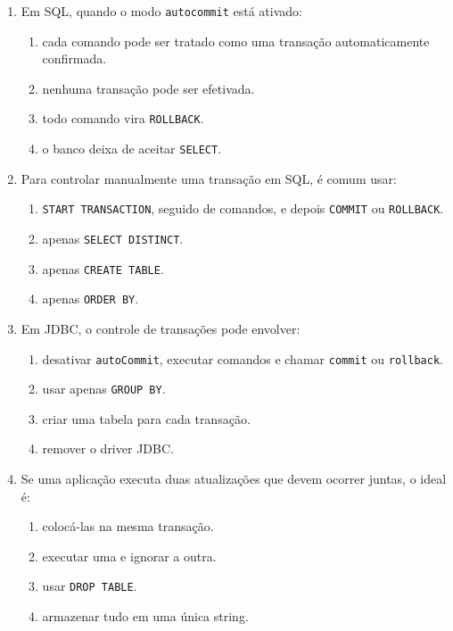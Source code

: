 \documentclass[12pt,a4paper]{article}
\begin{document}
\begin{enumerate}[label=\textbf{Q\arabic*.}]
\item Em SQL, quando o modo \texttt{autocommit} está ativado:

\begin{enumerate}[label=\alph*)]
    \item cada comando pode ser tratado como uma transação automaticamente confirmada.
    \item nenhuma transação pode ser efetivada.
    \item todo comando vira \texttt{ROLLBACK}.
    \item o banco deixa de aceitar \texttt{SELECT}.
\end{enumerate}

\item Para controlar manualmente uma transação em SQL, é comum usar:

\begin{enumerate}[label=\alph*)]
    \item \texttt{START TRANSACTION}, seguido de comandos, e depois \texttt{COMMIT} ou \texttt{ROLLBACK}.
    \item apenas \texttt{SELECT DISTINCT}.
    \item apenas \texttt{CREATE TABLE}.
    \item apenas \texttt{ORDER BY}.
\end{enumerate}

\item Em JDBC, o controle de transações pode envolver:

\begin{enumerate}[label=\alph*)]
    \item desativar \texttt{autoCommit}, executar comandos e chamar \texttt{commit} ou \texttt{rollback}.
    \item usar apenas \texttt{GROUP BY}.
    \item criar uma tabela para cada transação.
    \item remover o driver JDBC.
\end{enumerate}

\item Se uma aplicação executa duas atualizações que devem ocorrer juntas, o ideal é:

\begin{enumerate}[label=\alph*)]
    \item colocá-las na mesma transação.
    \item executar uma e ignorar a outra.
    \item usar \texttt{DROP TABLE}.
    \item armazenar tudo em uma única string.
\end{enumerate}


\end{enumerate}
\end{document}
